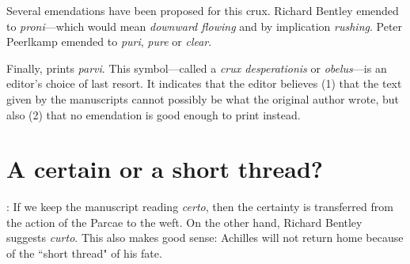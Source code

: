 Several emendations have been proposed for this crux.  Richard Bentley emended to \textit{proni}---which would mean \textit{downward flowing} and by implication \textit{rushing}.  Peter Peerlkamp emended to \textit{puri}, \textit{pure} or \textit{clear}.

Finally, \citet{sb1985} prints \textit{\dag parvi\dag}.  This symbol---called a \textit{crux desperationis} or \textit{obelus}---is an editor's choice of last resort.  It indicates that the editor believes (1) that the text given by the manuscripts cannot possibly be what the original author wrote, but also (2) that no emendation is good enough to print instead.


\section*{A certain or a short thread?}


: If we keep the manuscript reading \textit{certo}, then the certainty is transferred from the action of the Parcae to the weft.  On the other hand, Richard Bentley suggests \textit{curto}.  This also makes good sense: Achilles will not return home because of the ``short thread" of his fate.

